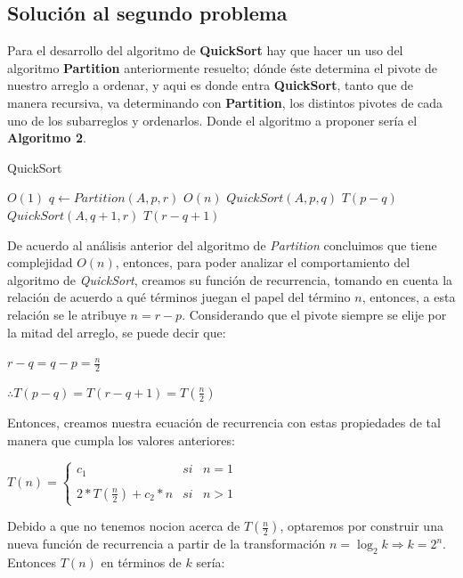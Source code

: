 \documentclass[12pt,twoside]{article}
\begin{document}
\subsection{\textbf{Soluci\'on al segundo problema}}

Para el desarrollo del algoritmo de \textbf{QuickSort} hay que hacer un uso del algoritmo \textbf{Partition} anteriormente resuelto; dónde éste
determina el pivote de nuestro arreglo a ordenar, y aqui es donde entra \textbf{QuickSort}, tanto que de manera recursiva, va determinando con 
\textbf{Partition}, los distintos pivotes de cada uno de los subarreglos y ordenarlos. Donde el algoritmo a proponer sería el \textbf{Algoritmo 2}.


\begin{algorithm}
  \caption{QuickSort}
  \begin{algorithmic}[1]
     \Comment $O(1)$
      \State $q \gets Partition(A, p, r)$ \Comment $O(n)$
      \State $QuickSort(A,p,q)$ \Comment $T(p - q)$
      \State $QuickSort(A,q + 1,r)$ \Comment $T(r - q + 1)$
    \EndIf
  \EndFunction
  \end{algorithmic}
\end{algorithm}

De acuerdo al análisis anterior del algoritmo de \textit{Partition} concluimos que tiene complejidad $O(n)$, entonces, para poder analizar 
el comportamiento del algoritmo de \textit{QuickSort}, creamos su función de recurrencia, tomando en cuenta la relación de acuerdo a qué términos
juegan el papel del término $n$, entonces, a esta relación se le atribuye $n = r - p$. Considerando que el pivote siempre se elije por la mitad del
arreglo, se puede decir que:
\centerline{}
\centerline{$r - q = q - p = \frac{n}{2}$}
\centerline{$\therefore T(p - q) = T(r - q + 1) = T(\frac{n}{2})$}

Entonces, creamos nuestra ecuación de recurrencia con estas propiedades de tal manera que cumpla los valores anteriores:
\begin{center}
  $T(n) =\left\{ \begin{array}{lcc}
      c_{1} &   si& n=1\\
  \\  2*T(\frac{n}{2}) + c_{2}*n &  si  & n>1 
  \end{array}
  \right.
  $
\end{center}

Debido a que no tenemos nocion acerca de $T(\frac{n}{2})$, optaremos por construir una nueva función de recurrencia a partir 
de la transformación $n = \log_{2} k \Rightarrow k = 2^n$. Entonces $T(n)$ en términos de $k$ sería:
\end{document}
